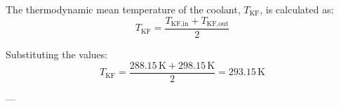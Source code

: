 The thermodynamic mean temperature of the coolant, \( T_{\text{KF}} \), is calculated as:  
\[
T_{\text{KF}} = \frac{T_{\text{KF,in}} + T_{\text{KF,out}}}{2}
\]  

Substituting the values:  
\[
T_{\text{KF}} = \frac{288.15 \, \text{K} + 298.15 \, \text{K}}{2} = 293.15 \, \text{K}
\]  

---